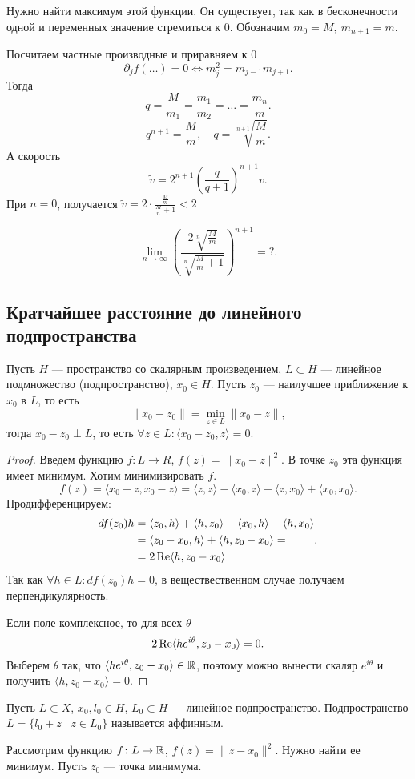 Нужно найти максимум этой функции. Он существует, так как в бесконечности  одной и переменных значение стремиться к 0.
Обозначим $ m_0 = M, ~ m_{n+1} = m$.

Посчитаем частные производные и приравняем к $ 0$ 
\[
    \partial _j f(\ldots ) = 0 \Longleftrightarrow  m_j^2=m_{j-1}m_{j+1}
.\] 
Тогда 
\[
q =     \frac{M}{m_1}= \frac{m_1}{m_2} = \ldots = \frac{m_n}{m}
.\] 
 \[
     q^{n+1} = \frac{M}{m}, \quad q = \sqrt[n+1]{\frac{M}{m}}
 .\] 
 А скорость
 \[
     \widetilde{ v} = 2^{n+1} \left( \frac{q}{q+1} \right) ^{n+1} v
 .\] 
 При $ n = 0$, получается  $ \widetilde{v} = 2\cdot \frac{\frac{M}{m}}{\frac{M}{n} + 1}  < 2$ 
\begin{prac}
    \[
		\lim_{n \to \infty} \left( \frac{2 \sqrt[n]{\frac{M}{m} }}{\sqrt[n]{\frac{M}{m}+1 } }  \right) ^{n+1} = ?
    .\] 
\end{prac}
\subsection{Кратчайшее расстояние до линейного подпространства}
\begin{thm}
	Пусть $ H$ --- пространство со скалярным произведением,  $ L \subset H$ --- линейное подмножество (подпространство), $ x_0 \in H$. Пусть $ z_0$ --- наилучшее приближение к $ x_0$ в $ L$, то есть
	 \[
	\| x_0 - z_0 \| = \min_{z \in  L} \| x_0 - z \| 
	,\] 
	тогда $ x_0-z_0 \perp L$, то есть $ \forall z \in L\colon \langle x_0 - z_0, z \rangle = 0$.
\end{thm}
\begin{proof}
	Введем функцию $ f\colon L \to  R$, $ f(z) = \| x_0 - z \|^2 $. В точке $ z_0$ эта функция имеет минимум.
	Хотим минимизировать $ f$.
	 \[
		 f(z) = \langle x_0 -z, x_0 -z \rangle = \langle z, z \rangle - \langle x_0, z \rangle - \langle z, x_0 \rangle + \langle x_0, x_0 \rangle
	.\] 
	Продифференцируем:
	\[
	\begin{aligned}
		df(z_0)h &= \langle z_0, h \rangle + \langle h, z_0 \rangle - \langle x_0, h \rangle - \langle h, x_0 \rangle \\
				 &= \langle z_0-x_0, h \rangle+ \langle  h, z_0 - x_0 \rangle = \\
				 &=2 \operatorname{Re} \langle h, z_0-x_0 \rangle
	\end{aligned}
	.\] 
	Так как $ \forall h \in L\colon df(z_0)h = 0$, в веществественном случае получаем перпендикулярность.
	
	Если поле комплексное, то для всех $ \theta $ 
	\[
		2 \operatorname{Re} \langle he^{i \theta }, z_0- x_0 \rangle = 0
	.\] 
	Выберем $ \theta $ так, что $ \langle he^{i \theta }, z_0 -x_0 \rangle \in  \mathbb{R}$,  поэтому можно вынести скаляр $ e^{i \theta }$ и получить $ \langle h, z_0-x_0 \rangle = 0$.
\end{proof}
\begin{defn}
   Пусть $ L \subset X$, $ x_0, l_0 \in H$, $ L_0 \subset H$ --- линейное подпространство. Подпространство $ L = \{l_0 + z \mid z \in L_0\}$ называется  {\sf аффинным}.  
\end{defn}
Рассмотрим функцию $ f\colon L \to  \mathbb{R}$, $ f(z) = \| z-x_0 \| ^2$. Нужно найти ее минимум. Пусть $ z_0$ --- точка минимума.


